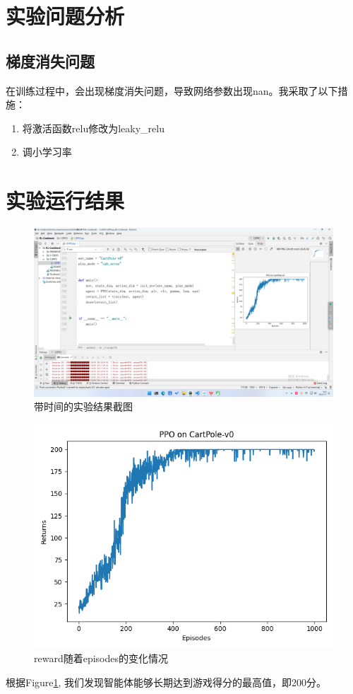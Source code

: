 \documentclass{article}
\begin{document}
\section{实验问题分析}
\subsection{梯度消失问题}
在训练过程中，会出现梯度消失问题，导致网络参数出现nan。我采取了以下措施：

\begin{enumerate}
  \item 将激活函数relu修改为leaky\_relu
  \item 调小学习率
\end{enumerate}


\section{实验运行结果}

\begin{figure}[htbp]
  \centering
  \includegraphics[width=1.2\columnwidth]{image/1.png}
  \caption{带时间的实验结果截图}
\end{figure} 

\par
\begin{figure}[htbp]
  \centering
  \includegraphics[width=1\columnwidth]{image/2.png}
  \caption{reward随着episodes的变化情况}
  \label{figure-2}
\end{figure} 
根据Figure\ref{figure-2}, 我们发现智能体能够长期达到游戏得分的最高值，即200分。
\end{document}
